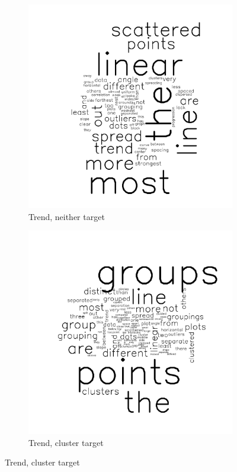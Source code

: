 \documentclass[11pt]{isuthesis}\usepackage[]{graphicx}\usepackage[]{color}
\begin{document}
\begin{figure}[ht]
\begin{subfigure}[t]{0.25\linewidth}
  \caption{Trend, neither target}
  \includegraphics[width=\linewidth]{fig-sentiment-4}
\end{subfigure}
\begin{subfigure}[t]{0.25\linewidth}
  \caption{Trend, cluster target}
  \includegraphics[width=\linewidth]{fig-sentiment-5}

\end{subfigure}
\end{figure}
\end{document}
